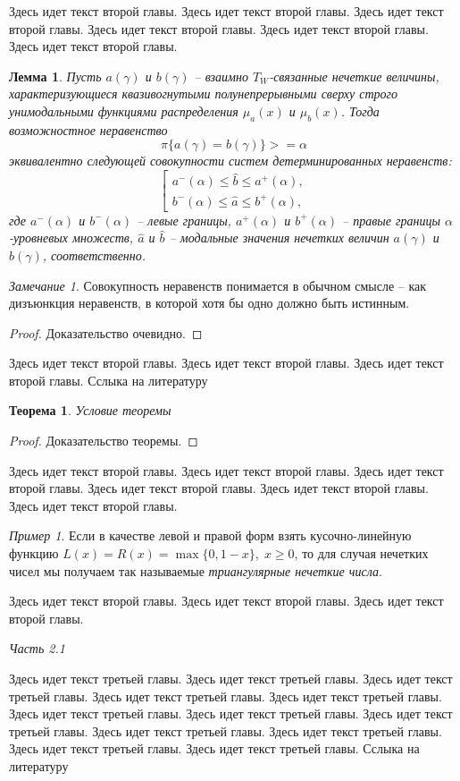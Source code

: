 \documentclass[a4paper,twoside]{article}
\newcommand{\subheader}[1]{\bigskip\medskip\noindent\emph{#1}\nopagebreak\bigskip}
\theoremstyle{theorem}
\newtheorem{theorem}{Теорема}
\newtheorem{lemma}{Лемма}
\theoremstyle{remark}
\newtheorem{remark}{Замечание}
\newtheorem{example}{Пример}
\begin{document}
Здесь идет текст второй главы. Здесь идет текст второй главы. Здесь идет текст второй главы.
Здесь идет текст второй главы. Здесь идет текст второй главы. Здесь идет текст второй главы.
\begin{lemma}
Пусть $a(\gamma)$ и $b(\gamma)$ -- взаимно $T_W$-связанные нечеткие величины, характеризующиеся квазивогнутыми полунепрерывными сверху строго унимодальными функциями распределения $\mu_a(x)$ и $\mu_b(x)$. Тогда возможностное неравенство
$$
\pi\{a(\gamma) = b(\gamma)\} >= \alpha
$$
эквивалентно следующей совокупности систем детерминированных неравенств:
$$
\left[\begin{array}{l}
a^-(\alpha) \leq \hat b \leq a^+(\alpha),\\
b^-(\alpha) \leq \hat a \leq b^+(\alpha),
\end{array}\right.
$$
где $a^-(\alpha)$ и $b^-(\alpha)$ -- левые границы, $a^+(\alpha)$ и $b^+(\alpha)$ -- правые границы $\alpha$-уровневых множеств, $\hat a$ и $\hat b$ -- модальные значения нечетких величин $a(\gamma)$ и $b(\gamma)$, соответственно.
\end{lemma}
\begin{remark}
Совокупность неравенств понимается в обычном смысле -- как дизъюнкция неравенств, в которой хотя бы одно должно быть истинным.
\end{remark}
\begin{proof}
Доказательство очевидно.
\end{proof}
Здесь идет текст второй главы. Здесь идет текст второй главы. Здесь идет текст второй главы.
Сслыка на литературу \cite{Berestova}
\begin{theorem}
Условие теоремы
\end{theorem}
\begin{proof}
Доказательство теоремы.
\end{proof}
Здесь идет текст второй главы. Здесь идет текст второй главы. Здесь идет текст второй главы.
Здесь идет текст второй главы. Здесь идет текст второй главы. Здесь идет текст второй главы.
\begin{example}
Если в качестве левой и правой форм взять кусочно-линейную функцию $L(x) = R(x) = \max\{0, 1 - x\},\;x\geq 0$,
то для случая нечетких чисел мы получаем так называемые {\it триангулярные нечеткие числа}.
\end{example}
Здесь идет текст второй главы. Здесь идет текст второй главы. Здесь идет текст второй главы.


\subheader{Часть 2.1}

Здесь идет текст третьей главы. Здесь идет текст третьей главы. Здесь идет текст третьей главы.
Здесь идет текст третьей главы. Здесь идет текст третьей главы. Здесь идет текст третьей главы.
Здесь идет текст третьей главы. Здесь идет текст третьей главы. Здесь идет текст третьей главы.
Здесь идет текст третьей главы. Здесь идет текст третьей главы. Здесь идет текст третьей главы.
Сслыка на литературу \cite{Article}
\end{document}
